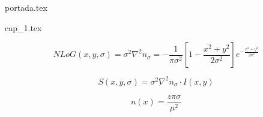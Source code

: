 \documentclass[12pt, a4paper]{article} %
\begin{document}

{portada.tex}



{cap_1.tex}





\newpage

\tableofcontents

\newpage

\newpage
\begin{equation}
    NLoG(x,y,\sigma) = \sigma^2\nabla^2 n_\sigma =  - \frac{1}{\pi\sigma^2}\left[1 - \frac{x^2 + y^2}{2\sigma^2}\right]e^{-\frac{x^2 + y^2}{2\sigma^2}}
\end{equation}

\begin{equation}
    S(x,y,\sigma) = \sigma^2\nabla^2 n_\sigma \cdot I(x,y)
\end{equation}

\begin{equation}
    n(x) = \frac{z\pi\sigma}{\mu^2}
\end{equation}
\end{document}
